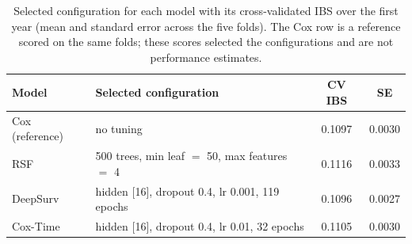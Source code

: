 \documentclass[11pt,a4paper]{article}
\begin{document}
\begin{table}[H]
\centering
\caption{Selected configuration for each model with its cross-validated
IBS over the first year (mean and standard error across the five folds). The Cox row is a
reference scored on the same folds; these scores selected the configurations and are not
performance estimates.}
\label{tab:hyper}
\vspace{0.3em}
\small
\begin{tabular}{llcc}
\toprule
Model & Selected configuration & CV IBS & SE \\
\midrule
Cox (reference) & no tuning                                        & 0.1097 & 0.0030 \\
RSF             & 500 trees, min leaf $=$ 50, max features $=$ 4   & 0.1116 & 0.0033 \\
DeepSurv        & hidden [16], dropout 0.4, lr 0.001, 119 epochs   & 0.1096 & 0.0027 \\
Cox-Time        & hidden [16], dropout 0.4, lr 0.01, 32 epochs     & 0.1105 & 0.0030 \\
\bottomrule
\end{tabular}
\end{table}
\end{document}
